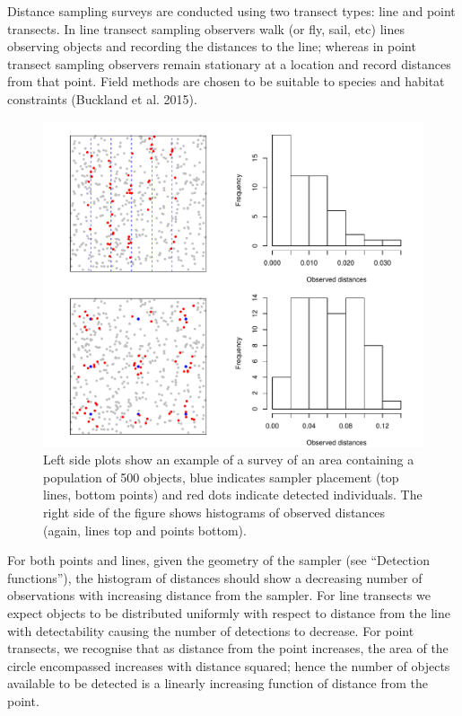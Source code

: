 \documentclass[article]{jss}
\begin{document}
Distance sampling surveys are conducted using two transect types: line
and point transects. In line transect sampling observers walk (or fly,
sail, etc) lines observing objects and recording the distances to the
line; whereas in point transect sampling observers remain stationary at
a location and record distances from that point. Field methods are
chosen to be suitable to species and habitat constraints (Buckland et
al. 2015).

\begin{CodeChunk}
\begin{figure}

{\centering \includegraphics{paper_files/figure-latex/points-and-lines-1} 

}

\caption{Left side plots show an example of a survey of an area containing a population of 500 objects, blue indicates sampler placement (top lines, bottom points) and red dots indicate detected individuals. The right side of the figure shows histograms of observed distances (again, lines top and points bottom).\label{fig:pointslines}}\label{fig:points-and-lines}
\end{figure}
\end{CodeChunk}

For both points and lines, given the geometry of the sampler (see
``Detection functions''), the histogram of distances should show a
decreasing number of observations with increasing distance from the
sampler. For line transects we expect objects to be distributed
uniformly with respect to distance from the line with detectability
causing the number of detections to decrease. For point transects, we
recognise that as distance from the point increases, the area of the
circle encompassed increases with distance squared; hence the number of
objects available to be detected is a linearly increasing function of
distance from the point.
\end{document}

